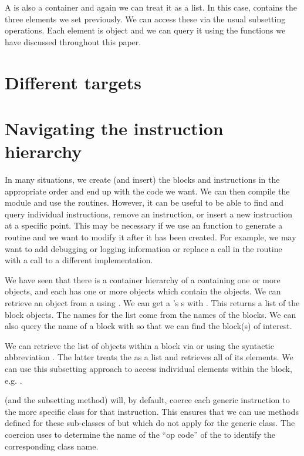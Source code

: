 A  is also a container and again we can treat it as a
list. In this case,  contains the three elements we
set previously.  We can access these via the usual subsetting
operations. Each element is  object and we can query
it using the functions we have discussed throughout this paper.



\section{Different targets}

\section{Navigating the instruction hierarchy}
In many situations, we create (and insert) the blocks and instructions
in the appropriate order and end up with the code we want.  We can
then compile the module and use the routines.  However, it can be
useful to be able to find and query individual instructions, remove an
instruction, or insert a new instruction at a specific point.  This
may be necessary if we use an \R{} function to generate a routine and
we want to modify it after it has been created.  For example, we may
want to add debugging or logging information or replace a call in the
routine with a call to a different implementation.

We have seen that there is a container hierarchy of a 
containing one or more  objects, and each
 has one or more  objects which
contain the  objects.
We can retrieve an  object from a 
using .
We can get a 's s with
.  This returns a list of the block objects.
The names for the list come from the names of the blocks.
We can also query the name of a block with 
so that we can find the block(s) of interest.

We can retrieve the list of  objects
within a block via  or using
the syntactic abbreviation .
The latter treats the  as a list and retrieves
all of its elements.  We can use this subsetting approach to access
individual  elements within the block, 
e.g. .

 (and the subsetting method)
will, by default, coerce each generic instruction to the more specific
class for that instruction.
This ensures that we can use  methods defined for these
sub-classes of  but which do not apply for
the generic  class.
The coercion uses  to determine the name of the ``op code'' of 
the  to identify the corresponding class name.

